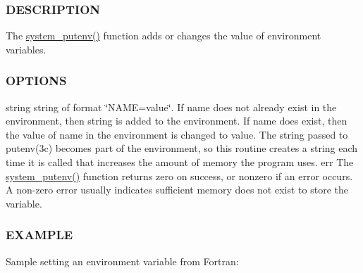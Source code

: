 \subsubsection*{D\+E\+S\+C\+R\+I\+P\+T\+I\+ON}

The \mbox{\hyperlink{namespacem__system_af0c9df8e59cac9cd617cd1e20448ea7d}{system\+\_\+putenv()}} function adds or changes the value of environment variables.

\subsubsection*{O\+P\+T\+I\+O\+NS}

string string of format \char`\"{}\+N\+A\+M\+E=value\char`\"{}. If name does not already exist in the environment, then string is added to the environment. If name does exist, then the value of name in the environment is changed to value. The string passed to putenv(3c) becomes part of the environment, so this routine creates a string each time it is called that increases the amount of memory the program uses. err The \mbox{\hyperlink{namespacem__system_af0c9df8e59cac9cd617cd1e20448ea7d}{system\+\_\+putenv()}} function returns zero on success, or nonzero if an error occurs. A non-\/zero error usually indicates sufficient memory does not exist to store the variable.

\subsubsection*{E\+X\+A\+M\+P\+LE}

Sample setting an environment variable from Fortran\+:

